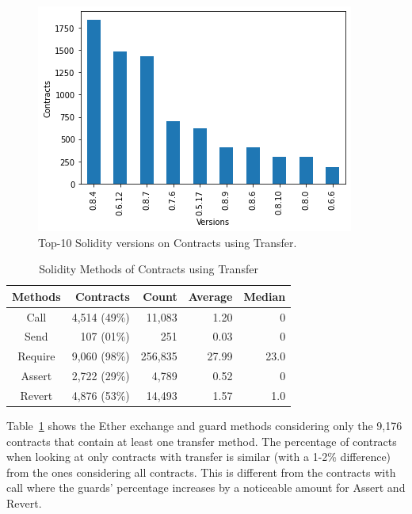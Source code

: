 \documentclass[10pt,conference]{IEEEtran}
\begin{document}
\begin{figure}[h]
  \centering
  \includegraphics[width=\linewidth]{./img/transfers_clean_final.png}
  \caption{Top-10 Solidity versions on Contracts using Transfer.}
  \label{fig:transfer_version}
\end{figure}

\begin{table}
\center
  \caption{Solidity Methods of Contracts using Transfer}
  \label{tab:transfer}
  \begin{tabular}{crrrr}
    \hline
    Methods & Contracts & Count & Average & Median \\
    \hline
    Call & 4,514 (49\%) & 11,083 & 1.20 & 0\\
    Send &107 (01\%) & 251 & 0.03 & 0\\
    Require & 9,060 (98\%) &256,835 & 27.99 & 23.0\\
    Assert & 2,722 (29\%) & 4,789 & 0.52 & 0\\
    Revert & 4,876 (53\%) & 14,493 & 1.57 & 1.0\\
    \hline
\end{tabular}
\end{table}


Table~\ref{tab:transfer} shows the Ether exchange and guard methods considering only the 9,176 contracts that contain at least one transfer method. The percentage of contracts when looking at only contracts with transfer is similar (with a 1-2\% difference) from the ones considering all contracts. This is different from the contracts with call where the guards' percentage increases by a noticeable amount for Assert and Revert.
\end{document}
